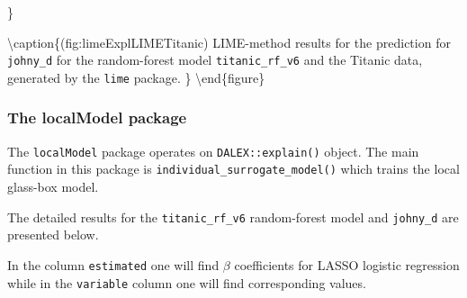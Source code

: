\documentclass[12pt,]{krantz}
\newenvironment{Shaded}{\begin{snugshade}}{\end{snugshade}}
\newcommand{\CommentTok}[1]{\textcolor[rgb]{0.56,0.35,0.01}{\textit{#1}}}
\newcommand{\DataTypeTok}[1]{\textcolor[rgb]{0.13,0.29,0.53}{#1}}
\newcommand{\DecValTok}[1]{\textcolor[rgb]{0.00,0.00,0.81}{#1}}
\newcommand{\KeywordTok}[1]{\textcolor[rgb]{0.13,0.29,0.53}{\textbf{#1}}}
\newcommand{\NormalTok}[1]{#1}
\newcommand{\OperatorTok}[1]{\textcolor[rgb]{0.81,0.36,0.00}{\textbf{#1}}}
\newcommand{\StringTok}[1]{\textcolor[rgb]{0.31,0.60,0.02}{#1}}
\begin{document}
\}

\textbackslash{}caption\{(fig:limeExplLIMETitanic) LIME-method results for the prediction for \texttt{johny\_d} for the random-forest model \texttt{titanic\_rf\_v6} and the Titanic data, generated by the \texttt{lime} package. \}\label{fig:limeExplLIMETitanic}
\textbackslash{}end\{figure\}

\hypertarget{the-localmodel-package}{%
\subsubsection{The localModel package}\label{the-localmodel-package}}

The \texttt{localModel} package operates on \texttt{DALEX::explain()} object. The main function in this package is \texttt{individual\_surrogate\_model()} which trains the local glass-box model.

The detailed results for the \texttt{titanic\_rf\_v6} random-forest model and \texttt{johny\_d} are presented below.

\begin{Shaded}
\end{Shaded}

In the column \texttt{estimated} one will find \(\beta\) coefficients for LASSO logistic regression while in the \texttt{variable} column one will find corresponding values.
\end{document}

